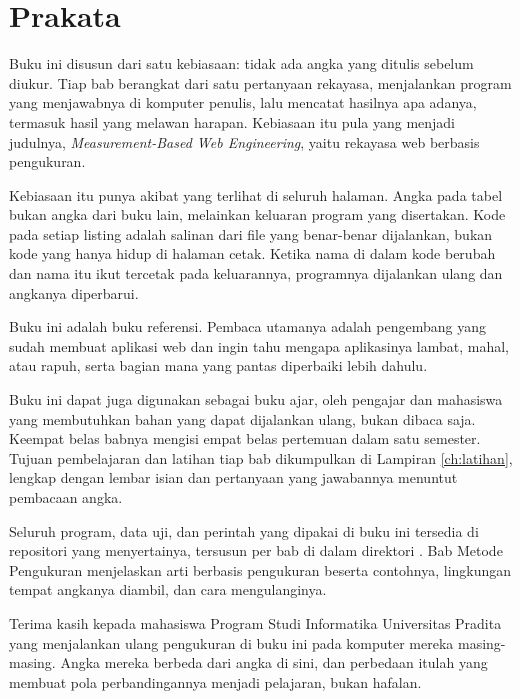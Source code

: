 \chapter*{Prakata}

Buku ini disusun dari satu kebiasaan: tidak ada angka yang ditulis sebelum
diukur. Tiap bab berangkat dari satu pertanyaan rekayasa, menjalankan
program yang menjawabnya di komputer penulis, lalu mencatat hasilnya apa
adanya, termasuk hasil yang melawan harapan. Kebiasaan itu pula yang menjadi
judulnya, \textit{Measurement-Based Web Engineering}, yaitu rekayasa web
berbasis pengukuran.

Kebiasaan itu punya akibat yang terlihat di seluruh halaman. Angka pada
tabel bukan angka dari buku lain, melainkan keluaran program yang
disertakan. Kode pada setiap listing adalah salinan dari file yang
benar-benar dijalankan, bukan kode yang hanya hidup di halaman cetak. Ketika
nama di dalam kode berubah dan nama itu ikut tercetak pada keluarannya,
programnya dijalankan ulang dan angkanya diperbarui.

Buku ini adalah buku referensi. Pembaca utamanya adalah pengembang yang
sudah membuat aplikasi web dan ingin tahu mengapa aplikasinya lambat, mahal,
atau rapuh, serta bagian mana yang pantas diperbaiki lebih dahulu.

Buku ini dapat juga digunakan sebagai buku ajar, oleh pengajar dan mahasiswa
yang membutuhkan bahan yang dapat dijalankan ulang, bukan dibaca saja.
Keempat belas babnya mengisi empat belas pertemuan dalam satu semester.
Tujuan pembelajaran dan latihan tiap bab dikumpulkan di Lampiran
\ref{ch:latihan}, lengkap dengan lembar isian dan pertanyaan yang jawabannya
menuntut pembacaan angka.

Seluruh program, data uji, dan perintah yang dipakai di buku ini tersedia di
repositori yang menyertainya, tersusun per bab di dalam direktori
. Bab Metode Pengukuran menjelaskan arti berbasis
pengukuran beserta contohnya, lingkungan tempat angkanya diambil, dan cara
mengulanginya.

Terima kasih kepada mahasiswa Program Studi Informatika Universitas Pradita
yang menjalankan ulang pengukuran di buku ini pada komputer mereka
masing-masing. Angka mereka berbeda dari angka di sini, dan perbedaan itulah
yang membuat pola perbandingannya menjadi pelajaran, bukan hafalan.
